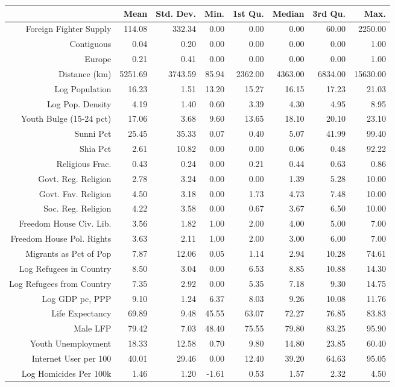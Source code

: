 \begin{table}[ht]
\centering
\begin{tabular}{rrrrrrrr}
  \hline
 & Mean & Std. Dev. & Min. & 1st Qu. & Median & 3rd Qu. & Max. \\ 
  \hline
Foreign Fighter Supply & 114.08 & 332.34 & 0.00 & 0.00 & 0.00 & 60.00 & 2250.00 \\ 
  Contiguous & 0.04 & 0.20 & 0.00 & 0.00 & 0.00 & 0.00 & 1.00 \\ 
  Europe & 0.21 & 0.41 & 0.00 & 0.00 & 0.00 & 0.00 & 1.00 \\ 
  Distance (km) & 5251.69 & 3743.59 & 85.94 & 2362.00 & 4363.00 & 6834.00 & 15630.00 \\ 
  Log Population & 16.23 & 1.51 & 13.20 & 15.27 & 16.15 & 17.23 & 21.03 \\ 
  Log Pop. Density & 4.19 & 1.40 & 0.60 & 3.39 & 4.30 & 4.95 & 8.95 \\ 
  Youth Bulge (15-24 pct) & 17.06 & 3.68 & 9.60 & 13.65 & 18.10 & 20.10 & 23.10 \\ 
  Sunni Pct & 25.45 & 35.33 & 0.07 & 0.40 & 5.07 & 41.99 & 99.40 \\ 
  Shia Pct & 2.61 & 10.82 & 0.00 & 0.00 & 0.06 & 0.48 & 92.22 \\ 
  Religious Frac. & 0.43 & 0.24 & 0.00 & 0.21 & 0.44 & 0.63 & 0.86 \\ 
  Govt. Reg. Religion & 2.78 & 3.24 & 0.00 & 0.00 & 1.39 & 5.28 & 10.00 \\ 
  Govt. Fav. Religion & 4.50 & 3.18 & 0.00 & 1.73 & 4.73 & 7.48 & 10.00 \\ 
  Soc. Reg. Religion & 4.22 & 3.58 & 0.00 & 0.67 & 3.67 & 6.50 & 10.00 \\ 
  Freedom House Civ. Lib. & 3.56 & 1.82 & 1.00 & 2.00 & 4.00 & 5.00 & 7.00 \\ 
  Freedom House Pol. Rights & 3.63 & 2.11 & 1.00 & 2.00 & 3.00 & 6.00 & 7.00 \\ 
  Migrants as Pct of Pop & 7.87 & 12.06 & 0.05 & 1.14 & 2.94 & 10.28 & 74.61 \\ 
  Log Refugees in Country & 8.50 & 3.04 & 0.00 & 6.53 & 8.85 & 10.88 & 14.30 \\ 
  Log Refugees from Country & 7.35 & 2.92 & 0.00 & 5.35 & 7.18 & 9.30 & 14.75 \\ 
  Log GDP pc, PPP & 9.10 & 1.24 & 6.37 & 8.03 & 9.26 & 10.08 & 11.76 \\ 
  Life Expectancy & 69.89 & 9.48 & 45.55 & 63.07 & 72.27 & 76.85 & 83.83 \\ 
  Male LFP & 79.42 & 7.03 & 48.40 & 75.55 & 79.80 & 83.25 & 95.90 \\ 
  Youth Unemployment & 18.33 & 12.58 & 0.70 & 9.80 & 14.80 & 23.85 & 60.40 \\ 
  Internet User per 100 & 40.01 & 29.46 & 0.00 & 12.40 & 39.20 & 64.63 & 95.05 \\ 
  Log Homicides Per 100k & 1.46 & 1.20 & -1.61 & 0.53 & 1.57 & 2.32 & 4.50 \\ 
   \hline
\end{tabular}
\end{table}
